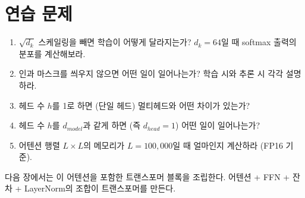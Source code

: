 \section{연습 문제}

\begin{enumerate}
  \item $\sqrt{d_k}$ 스케일링을 빼면 학습이 어떻게 달라지는가? $d_k = 64$일 때 softmax 출력의 분포를 계산해보라.
  \item 인과 마스크를 씌우지 않으면 어떤 일이 일어나는가? 학습 시와 추론 시 각각 설명하라.
  \item 헤드 수 $h$를 1로 하면 (단일 헤드) 멀티헤드와 어떤 차이가 있는가?
  \item 헤드 수 $h$를 $d_{model}$과 같게 하면 (즉 $d_{head} = 1$) 어떤 일이 일어나는가?
  \item 어텐션 행렬 $L \times L$의 메모리가 $L = 100,000$일 때 얼마인지 계산하라 (FP16 기준).
\end{enumerate}

다음 장에서는 이 어텐션을 포함한 트랜스포머 블록을 조립한다. 어텐션 + FFN + 잔차 + LayerNorm의 조합이 트랜스포머를 만든다.
